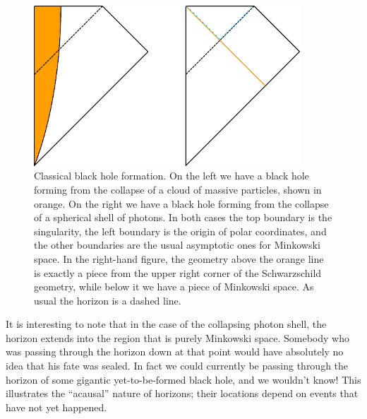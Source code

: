 \documentclass[12pt]{article}
\begin{document}
\begin{figure}
\begin{center}
\includegraphics[height=6cm]{collapse.pdf}
\caption{Classical black hole formation.  On the left we have a black hole forming from the collapse of a cloud of massive particles, shown in orange.  On the right we have a black hole forming from the collapse of a spherical shell of photons.  In both cases the top boundary is the singularity, the left boundary is the origin of polar coordinates, and the other boundaries are the usual asymptotic ones for Minkowski space.  In the right-hand figure, the geometry above the orange line is exactly a piece from the upper right corner of the Schwarzschild geometry, while below it we have a piece of Minkowski space.  As usual the horizon is a dashed line.}\label{collapse}
\end{center}
\end{figure}

It is interesting to note that in the case of the collapsing photon shell, the horizon extends into the region that is purely Minkowski space.  Somebody who was passing through the horizon down at that point would have absolutely no idea that his fate was sealed.  In fact we could currently be passing through the horizon of some gigantic yet-to-be-formed black hole, and we wouldn't know!  This illustrates the ``acausal'' nature of horizons; their locations depend on events that have not yet happened.  
\end{document}
